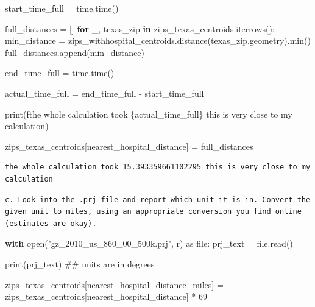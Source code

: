 \documentclass[
  letterpaper,
  DIV=11,
  numbers=noendperiod]{scrartcl}
\newenvironment{Shaded}{\begin{snugshade}}{\end{snugshade}}
\newcommand{\BuiltInTok}[1]{\textcolor[rgb]{0.00,0.23,0.31}{#1}}
\newcommand{\CommentTok}[1]{\textcolor[rgb]{0.37,0.37,0.37}{#1}}
\newcommand{\ControlFlowTok}[1]{\textcolor[rgb]{0.00,0.23,0.31}{\textbf{#1}}}
\newcommand{\DecValTok}[1]{\textcolor[rgb]{0.68,0.00,0.00}{#1}}
\newcommand{\ImportTok}[1]{\textcolor[rgb]{0.00,0.46,0.62}{#1}}
\newcommand{\KeywordTok}[1]{\textcolor[rgb]{0.00,0.23,0.31}{\textbf{#1}}}
\newcommand{\NormalTok}[1]{\textcolor[rgb]{0.00,0.23,0.31}{#1}}
\newcommand{\OperatorTok}[1]{\textcolor[rgb]{0.37,0.37,0.37}{#1}}
\newcommand{\SpecialCharTok}[1]{\textcolor[rgb]{0.37,0.37,0.37}{#1}}
\newcommand{\SpecialStringTok}[1]{\textcolor[rgb]{0.13,0.47,0.30}{#1}}
\newcommand{\StringTok}[1]{\textcolor[rgb]{0.13,0.47,0.30}{#1}}
\begin{document}
\begin{Shaded}
\begin{Highlighting}[]
\NormalTok{start\_time\_full }\OperatorTok{=}\NormalTok{ time.time()}

\NormalTok{full\_distances }\OperatorTok{=}\NormalTok{ []}
\ControlFlowTok{for}\NormalTok{ \_, texas\_zip }\KeywordTok{in}\NormalTok{ zips\_texas\_centroids.iterrows():}
\NormalTok{    min\_distance }\OperatorTok{=}\NormalTok{ zips\_withhospital\_centroids.distance(texas\_zip.geometry).}\BuiltInTok{min}\NormalTok{()}
\NormalTok{    full\_distances.append(min\_distance)}


\NormalTok{end\_time\_full }\OperatorTok{=}\NormalTok{ time.time()}

\NormalTok{actual\_time\_full }\OperatorTok{=}\NormalTok{ end\_time\_full }\OperatorTok{{-}}\NormalTok{ start\_time\_full}

\BuiltInTok{print}\NormalTok{(}\SpecialStringTok{f\textquotesingle{}the whole calculation took }\SpecialCharTok{\{}\NormalTok{actual\_time\_full}\SpecialCharTok{\}}\SpecialStringTok{ this is very close to my calculation\textquotesingle{}}\NormalTok{)}

\NormalTok{zips\_texas\_centroids[}\StringTok{\textquotesingle{}nearest\_hospital\_distance\textquotesingle{}}\NormalTok{] }\OperatorTok{=}\NormalTok{ full\_distances}
\end{Highlighting}
\end{Shaded}

\begin{verbatim}
the whole calculation took 15.393359661102295 this is very close to my calculation
\end{verbatim}

\begin{verbatim}
c. Look into the .prj file and report which unit it is in. Convert the given unit to miles, using an appropriate conversion you find online (estimates are okay).
\end{verbatim}

\begin{Shaded}
\begin{Highlighting}[]
\ControlFlowTok{with} \BuiltInTok{open}\NormalTok{(}\StringTok{"gz\_2010\_us\_860\_00\_500k.prj"}\NormalTok{, }\StringTok{\textquotesingle{}r\textquotesingle{}}\NormalTok{) }\ImportTok{as} \BuiltInTok{file}\NormalTok{:}
\NormalTok{    prj\_text }\OperatorTok{=} \BuiltInTok{file}\NormalTok{.read()}

\BuiltInTok{print}\NormalTok{(prj\_text) }\CommentTok{\#\# units are in degrees}

\NormalTok{zips\_texas\_centroids[}\StringTok{\textquotesingle{}nearest\_hospital\_distance\_miles\textquotesingle{}}\NormalTok{] }\OperatorTok{=}\NormalTok{ zips\_texas\_centroids[}\StringTok{\textquotesingle{}nearest\_hospital\_distance\textquotesingle{}}\NormalTok{] }\OperatorTok{*} \DecValTok{69}
\end{Highlighting}
\end{Shaded}
\end{document}
